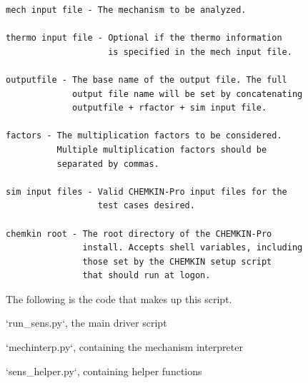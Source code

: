 \documentclass[12pt,letterpaper,oneside,draft]{book}
\begin{document}
\begin{appendices}
\begin{singlespace}
{\begin{Verbatim}
mech input file - The mechanism to be analyzed.

thermo input file - Optional if the thermo information
                    is specified in the mech input file.

outputfile - The base name of the output file. The full
             output file name will be set by concatenating
             outputfile + rfactor + sim input file.

factors - The multiplication factors to be considered.
          Multiple multiplication factors should be
          separated by commas.

sim input files - Valid CHEMKIN-Pro input files for the
                  test cases desired.

chemkin root - The root directory of the CHEMKIN-Pro
               install. Accepts shell variables, including
               those set by the CHEMKIN setup script
               that should run at logon.
\end{Verbatim}

The following is the code that makes up this script.

\cleardoublepage

{\Large `run\_sens.py`, the main driver script}


\cleardoublepage

{\Large `mechinterp.py`, containing the mechanism interpreter}


\cleardoublepage

{\Large `sens\_helper.py`, containing helper functions}

}
\end{singlespace}
\end{appendices}
\end{document}
